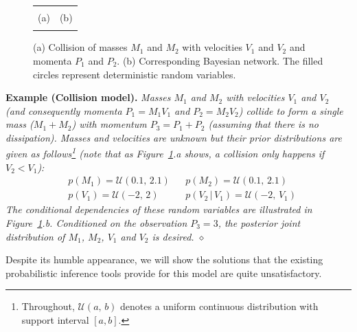 \documentclass{article}
\newcommand{\pr}{p}
\begin{document}
\begin{figure}[t!]
\begin{center}
\begin{tabular}{cc}
\vspace{-1.5mm}
\\
\hspace{-5mm} \footnotesize(a) 
& \hspace{-3mm} \footnotesize(b)  \\
\multicolumn{2}{c}{}
\end{tabular}
\end{center}
\vspace{-6mm}
\caption{\footnotesize
(a) Collision of masses $M_1$ and $M_2$ with velocities $V_1$ and $V_2$ and momenta $P_1$ and $P_2$. 
(b) Corresponding Bayesian network. The filled circles represent deterministic random variables.} 
\label{fig:mom0}
\vspace{-7mm}
\end{figure}


{\bf Example (Collision model). }
\emph{Masses $M_1$ and $M_2$ with velocities $V_1$ and $V_2$ (and consequently momenta $P_1 = M_1 V_1$ and $P_2 = M_2 V_2$) collide to form a single mass ($M_1 + M_2$) with momentum $P_3 = P_1 + P_2$ (assuming that there is no dissipation).
Masses and velocities are unknown but 
their prior distributions are given as follows\footnote{
Throughout, $\mathcal{U}(a, \, b)$ denotes a uniform continuous distribution 
with support interval $[a, b]$.
} 
(note that as Figure~\ref{fig:mom0}.a shows, a collision only happens if $V_2 < V_1$):  
}%
{\footnotesize \vspace{-0.5mm}
\begin{align}
&\pr(M_1) = \mathcal{U}(0.1, \, 2.1) 
&&\pr(M_2) \!=\! \mathcal{U}(0.1, \, 2.1)
\nonumber
\\
&\pr(V_1) = \mathcal{U}(-2, \, 2)
&&\pr(V_2 \, | \, V_1) = \mathcal{U}(-2, \, V_1)
\label{e:collision}
\end{align} 
}
\emph{
\!\!\!The conditional dependencies of these random variables are illustrated in 
Figure~\ref{fig:mom0}.b.
Conditioned on the observation $P_3 = 3$, the posterior joint distribution of $M_1$, $M_2$, $V_1$ and $V_2$ is desired. 
\hspace*{\fill} $\diamond$} %

Despite its humble appearance, we will show the solutions that the existing probabilistic inference tools provide for this model are quite unsatisfactory. 
\end{document}
